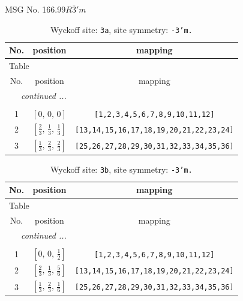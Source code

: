 \documentclass[fleqn,8pt]{jsarticle}
\begin{document}
\setcounter{MaxMatrixCols}{32}

\renewcommand{\tablename}{Table~}
\renewcommand{\figurename}{Figure~}
\begin{center}
\LARGE
MSG No. 166.99\quad$R\bar{3}'m$
\end{center}
\renewcommand{\arraystretch}{1.2}
\begin{longtable}{ccc}
\caption{Wyckoff site: {\tt 3a}, site symmetry: {\tt -3'm.}}
 \\
 \hline \hline
No. & position & mapping \\ \hline \endfirsthead

\multicolumn{2}{l}{\tablename\ \thetable{}} \\
 \hline \hline
No. & position & mapping \\ \hline \endhead

 \hline \hline
\multicolumn{2}{r}{\footnotesize\it continued ...} \\ \endfoot

 \hline \hline
\multicolumn{2}{r}{} \\ \endlastfoot

1 & $\left[ 0,\, 0,\, 0 \right]$ & {\tt [1,2,3,4,5,6,7,8,9,10,11,12]} \\ \hline
2 & $\left[ \frac{2}{3},\, \frac{1}{3},\, \frac{1}{3} \right]$ & {\tt [13,14,15,16,17,18,19,20,21,22,23,24]} \\ \hline
3 & $\left[ \frac{1}{3},\, \frac{2}{3},\, \frac{2}{3} \right]$ & {\tt [25,26,27,28,29,30,31,32,33,34,35,36]} \\
\end{longtable}
\renewcommand{\arraystretch}{1.2}
\begin{longtable}{ccc}
\caption{Wyckoff site: {\tt 3b}, site symmetry: {\tt -3'm.}}
 \\
 \hline \hline
No. & position & mapping \\ \hline \endfirsthead

\multicolumn{2}{l}{\tablename\ \thetable{}} \\
 \hline \hline
No. & position & mapping \\ \hline \endhead

 \hline \hline
\multicolumn{2}{r}{\footnotesize\it continued ...} \\ \endfoot

 \hline \hline
\multicolumn{2}{r}{} \\ \endlastfoot

1 & $\left[ 0,\, 0,\, \frac{1}{2} \right]$ & {\tt [1,2,3,4,5,6,7,8,9,10,11,12]} \\ \hline
2 & $\left[ \frac{2}{3},\, \frac{1}{3},\, \frac{5}{6} \right]$ & {\tt [13,14,15,16,17,18,19,20,21,22,23,24]} \\ \hline
3 & $\left[ \frac{1}{3},\, \frac{2}{3},\, \frac{1}{6} \right]$ & {\tt [25,26,27,28,29,30,31,32,33,34,35,36]} \\
\end{longtable}
\end{document}
